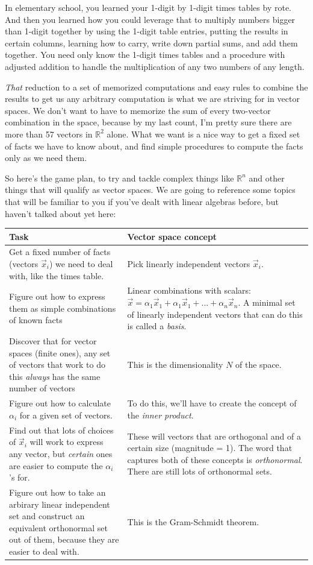 \documentclass[
]{book}
\begin{document}
In elementary school, you learned your 1-digit by 1-digit times tables by rote. And then you learned how you could leverage that to multiply numbers bigger than 1-digit together by using the 1-digit table entries, putting the results in certain columns, learning how to carry, write down partial sums, and add them together. You need only know the 1-digit times tables and a procedure with adjusted addition to handle the multiplication of any two numbers of any length.

\emph{That} reduction to a set of memorized computations and easy rules to combine the results to get us any arbitrary computation is what we are striving for in vector spaces. We don't want to have to memorize the sum of every two-vector combination in the space, because by my last count, I'm pretty sure there are more than 57 vectors in \(\mathbb{R}^2\) alone. What we want is a nice way to get a fixed set of facts we have to know about, and find simple procedures to compute the facts only as we need them.

So here's the game plan, to try and tackle complex things like \(\mathbb{R}^n\) and other things that will qualify as vector spaces. We are going to reference some topics that will be familiar to you if you've dealt with linear algebras before, but haven't talked about yet here:

\begin{longtable}[]{@{}
  >{\raggedright\arraybackslash}p{}
  >{\raggedright\arraybackslash}p{}@{}}
\toprule
Task & Vector space concept \\
\midrule
\endhead
Get a fixed number of facts (vectors \(\vec{x}_{i}\)) we need to deal with, like the times table. & Pick linearly independent vectors \(\vec{x}_{i}\). \\
Figure out how to express them as simple combinations of known facts & Linear combinations with scalars: \(\vec{x} = \alpha_{1} \vec{x}_{1} + \alpha_{1} \vec{x}_{1} + ... + \alpha_{n} \vec{x}_{n}\). A minimal set of linearly independent vectors that can do this is called a \emph{basis}. \\
Discover that for vector spaces (finite ones), any set of vectors that work to do this \emph{always} has the same number of vectors & This is the dimensionality \(N\) of the space. \\
Figure out how to calculate \(\alpha_{i}\) for a given set of vectors. & To do this, we'll have to create the concept of the \emph{inner product}. \\
Find out that lots of choices of \(\vec{x}_{i}\) will work to express any vector, but \emph{certain} ones are easier to compute the \(\alpha_{i}\)'s for. & These will vectors that are orthogonal and of a certain size (magnitude = 1). The word that captures both of these concepts is \emph{orthonormal}. There are still lots of orthonormal sets. \\
Figure out how to take an arbirary linear independent set and construct an equivalent orthonormal set out of them, because they are easier to deal with. & This is the Gram-Schmidt theorem. \\
\bottomrule
\end{longtable}
\end{document}
